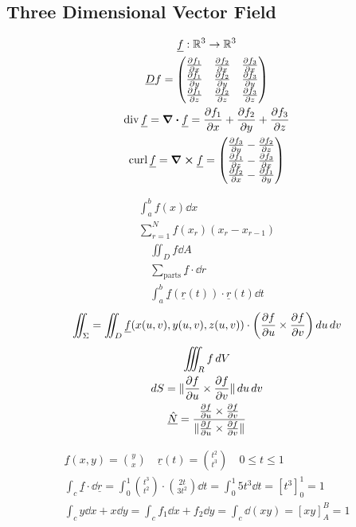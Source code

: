 \documentclass[00_complete]{subfiles}
\begin{document}
\subsection{Three Dimensional Vector Field}
\begin{gather*}
    \underline f: \mathbb{R}^3 \to \mathbb{R}^3 \\
    \underline D f = \begin{pmatrix}
        \pdv{f_1}{x} & \pdv{f_2}{x} & \pdv{f_3}{x} \\
        \pdv{f_1}{y} & \pdv{f_2}{y} & \pdv{f_3}{y} \\
        \pdv{f_1}{z} & \pdv{f_2}{z} & \pdv{f_3}{z} \\
    \end{pmatrix} \\
    \operatorname{div} \underline f = \div \underline f = \pdv{f_1}{x} +
    \pdv{f_2}{y} + \pdv{f_3}{z} \\
    \operatorname{curl} \underline f = \curl \underline f = \begin{pmatrix}
        \pdv{f_3}{y} - \pdv{f_2}{z} \\
        \pdv{f_1}{z} - \pdv{f_3}{x} \\
        \pdv{f_2}{x} - \pdv{f_1}{y}
    \end{pmatrix}
\end{gather*}

\begin{gather*}
    \int_{a}^{b}f(x)\dd{x} \\
    \sum_{r=1}^{N}f(x_r)(x_r-x_{r-1})
\end{gather*}
\begin{gather*}
    \iint_Df \dd{A} \\
    \sum_{\text{parts}}\underline f \cdot \dd{r} \\
    \int_{a}^{b}\underline f (\underline r(t)) \cdot \underline r(t) \dd{t}
\end{gather*}
\begin{gather*}
    \iint_\Sigma = \iint_D \underline f(x(u,v),y(u,v),z(u,v)) \cdot
    \left(\pdv{f}{u} \times \pdv{f}{v}\right) \dd{u}\dd{v}
\end{gather*}
\begin{gather*}
    \iiint_R f \dd{V} \\
    \dd{S} = \|\pdv{f}{u}\times\pdv{f}{v}\|\dd{u}\dd{v} \\
    \underline{\hat N} = \frac{\pdv{f}{u}\times\pdv{f}{v}}{\|\pdv{f}{u}\times\pdv{f}{v}\|}
\end{gather*}
\begin{example}
\begin{gather*}
    \underline f(x,y) = \binom{y}{x} \quad \underline r(t)= \binom{t^2}{t^3}
    \quad 0 \leq t \leq 1 \\
    \int_c \underline f \cdot \dd{\underline r} =
    \int_{0}^{1}\binom{t^3}{t^2}\cdot\binom{2t}{3t^2}\dd{t}=
    \int_{0}^{1}5t^3\dd{t} = \left[t^3\right]_0^1=1 \\
    \int_cy\dd{x}+x\dd{y} = \int_cf_1\dd{x} + f_2\dd{y} =
    \int_c\dd(xy)=\left[xy\right]_A^B=1
\end{gather*}
\end{example}
\end{document}

